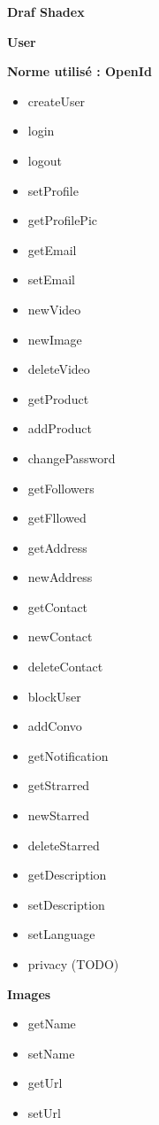 \documentclass{article}
\begin{document}
\begin{center}
\Large{\textbf{Draf Shadex}}
\end{center}

\Large{\textbf{User}}
\vspace{0.5cm}

\begin{large}
\textbf{Norme utilisé : OpenId}

\begin{itemize}
\item createUser
\item login
\item logout
\item setProfile
\item getProfilePic
\item getEmail
\item setEmail
\item newVideo
\item newImage
\item deleteVideo
\item getProduct
\item addProduct
\item changePassword
\item getFollowers
\item getFllowed
\item getAddress
\item newAddress
\item getContact
\item newContact
\item deleteContact
\item blockUser
\item addConvo
\item getNotification
\item getStrarred
\item newStarred
\item deleteStarred
\item getDescription
\item setDescription
\item setLanguage
\item privacy (TODO)
\end{itemize}
\end{large}


\Large{\textbf{Images}}

\begin{large}
\begin{itemize}
\item getName
\item setName
\item getUrl
\item setUrl
\end{itemize}
\end{large}
\end{document}
